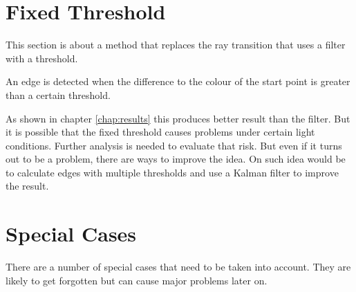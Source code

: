 \section{Fixed Threshold}
\label{sec:fixedThreshold}
This section is about a method that replaces the ray transition that uses a filter with a threshold.

An edge is detected when the difference to the colour of the start point is greater than a certain threshold.

As shown in chapter \ref{chap:results} this produces better result than the filter. But it is possible that the fixed threshold causes problems under certain light conditions. Further analysis is needed to evaluate that risk. But even if it turns out to be a problem, there are ways to improve the idea. On such idea would be to calculate edges with multiple thresholds and use a Kalman filter to improve the result.
\section{Special Cases}
\label{sec:specialCases}
There are a number of special cases that need to be taken into account. They are likely to get forgotten but can cause major problems later on.

